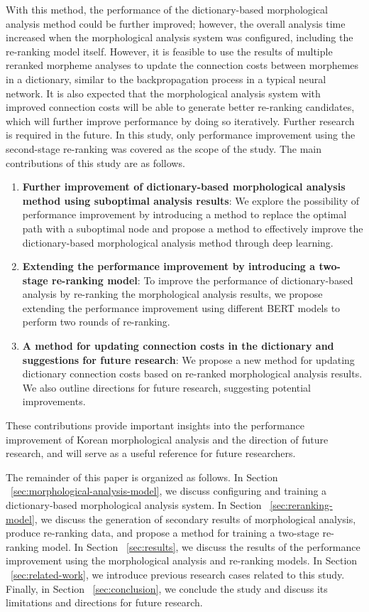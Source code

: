 \documentclass[AMS,STIX2COL]{WileyNJD-v2}
\begin{document}
    With this method, the performance of the dictionary-based morphological analysis method could be further improved; however, the overall analysis time increased when the morphological analysis system was configured, including the re-ranking model itself.
    However, it is feasible to use the results of multiple reranked morpheme analyses to update the connection costs between morphemes in a dictionary, similar to the backpropagation process in a typical neural network.
    It is also expected that the morphological analysis system with improved connection costs will be able to generate better re-ranking candidates, which will further improve performance by doing so iteratively.
    Further research is required in the future.
    In this study, only performance improvement using the second-stage re-ranking was covered as the scope of the study.
    The main contributions of this study are as follows.
    \begin{enumerate}
        \item \textbf{Further improvement of dictionary-based morphological analysis method using suboptimal analysis results}: We explore the possibility of performance improvement by introducing a method to replace the optimal path with a suboptimal node and propose a method to effectively improve the dictionary-based morphological analysis method through deep learning.
        \item \textbf{Extending the performance improvement by introducing a two-stage re-ranking model}: To improve the performance of dictionary-based analysis by re-ranking the morphological analysis results, we propose extending the performance improvement using different BERT models to perform two rounds of re-ranking.
        \item \textbf{A method for updating connection costs in the dictionary and suggestions for future research}: We propose a new method for updating dictionary connection costs based on re-ranked morphological analysis results. We also outline directions for future research, suggesting potential improvements.
    \end{enumerate}
    These contributions provide important insights into the performance improvement of Korean morphological analysis and the direction of future research, and will serve as a useful reference for future researchers.

    The remainder of this paper is organized as follows.
    In Section ~\ref{sec:morphological-analysis-model}, we discuss configuring and training a dictionary-based morphological analysis system.
    In Section ~\ref{sec:reranking-model}, we discuss the generation of secondary results of morphological analysis, produce re-ranking data, and propose a method for training a two-stage re-ranking model.
    In Section ~\ref{sec:results}, we discuss the results of the performance improvement using the morphological analysis and re-ranking models.
    In Section ~\ref{sec:related-work}, we introduce previous research cases related to this study.
    Finally, in Section ~\ref{sec:conclusion}, we conclude the study and discuss its limitations and directions for future research.
\end{document}

